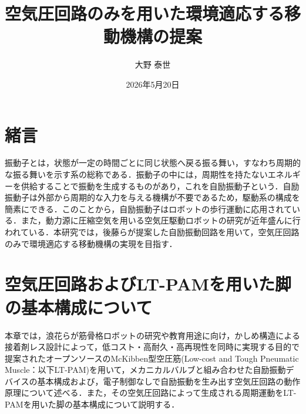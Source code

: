\documentclass[uplatex,dvipdfmx]{jsarticle}
\title{空気圧回路のみを用いた環境適応する移動機構の提案}
\author{大野 泰世}
\date{2026年5月20日}%
\begin{document}
\maketitle
\thispagestyle{empty}
\section{緒言}
振動子とは，状態が一定の時間ごとに同じ状態へ戻る振る舞い，すなわち周期的な振る舞いを示す系の総称である．振動子の中には，周期性を持たないエネルギーを供給することで振動を生成するものがあり，これを自励振動子という．自励振動子は外部から周期的な入力を与える機構が不要であるため，駆動系の構成を簡素にできる．このことから，自励振動子はロボットの歩行運動に応用されている\cite{}．また，動力源に圧縮空気を用いる空気圧駆動ロボットの研究が近年盛んに行われている．本研究では，後藤らが提案した自励振動回路を用いて，空気圧回路のみで環境適応する移動機構の実現を目指す．

\section{空気圧回路およびLT-PAMを用いた脚の基本構成について}
本章では，浪花らが筋骨格ロボットの研究や教育用途に向け，かしめ構造による接着剤レス設計によって，低コスト・高耐久・高再現性を同時に実現する目的で提案されたオープンソースのMcKibben型空圧筋(Low-cost and Tough Pneumatic Muscle：以下LT-PAM)\cite{naniwa2025ltpam}を用いて，メカニカルバルブと組み合わせた自励振動デバイスの基本構成および，電子制御なしで自励振動を生み出す空気圧回路の動作原理について述べる．また，その空気圧回路によって生成される周期運動をLT-PAMを用いた脚の基本構成について説明する．
\end{document}
